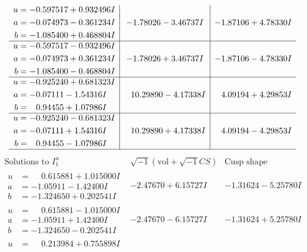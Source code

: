 \documentclass[1p]{elsarticle_modified}
\theoremstyle{definition}
\newcommand{\I}{\sqrt{-1}}
\begin{document}
$$\begin{array}{c|c|c}
\begin{aligned}
u &= -0.597517 + 0.932496 I \\
a &= -0.074973 - 0.361234 I \\
b &= -1.085400 + 0.468804 I\end{aligned}
 & -1.78026 - 3.46737 I & -1.87106 + 4.78330 I \\ \hline\begin{aligned}
u &= -0.597517 - 0.932496 I \\
a &= -0.074973 + 0.361234 I \\
b &= -1.085400 - 0.468804 I\end{aligned}
 & -1.78026 + 3.46737 I & -1.87106 - 4.78330 I \\ \hline\begin{aligned}
u &= -0.925240 + 0.681323 I \\
a &= -0.07111 - 1.54316 I \\
b &= \phantom{-}0.94455 + 1.07986 I\end{aligned}
 & \phantom{-}10.29890 - 4.17338 I & \phantom{-}4.09194 + 4.29853 I \\ \hline\begin{aligned}
u &= -0.925240 - 0.681323 I \\
a &= -0.07111 + 1.54316 I \\
b &= \phantom{-}0.94455 - 1.07986 I\end{aligned}
 & \phantom{-}10.29890 + 4.17338 I & \phantom{-}4.09194 - 4.29853 I\\
 \hline 
 \end{array}$$\newpage$$\begin{array}{c|c|c}  
\text{Solutions to }I^u_{1}& \I (\text{vol} + \sqrt{-1}CS) & \text{Cusp shape}\\
 \hline 
\begin{aligned}
u &= \phantom{-}0.615881 + 1.015000 I \\
a &= -1.05911 - 1.42400 I \\
b &= -1.324650 + 0.202541 I\end{aligned}
 & -2.47670 + 6.15727 I & -1.31624 - 5.25780 I \\ \hline\begin{aligned}
u &= \phantom{-}0.615881 - 1.015000 I \\
a &= -1.05911 + 1.42400 I \\
b &= -1.324650 - 0.202541 I\end{aligned}
 & -2.47670 - 6.15727 I & -1.31624 + 5.25780 I \\ \hline\begin{aligned}
u &= \phantom{-}0.213984 + 0.755898 I \\

\end{aligned}
\end{array}$$
\end{document}

